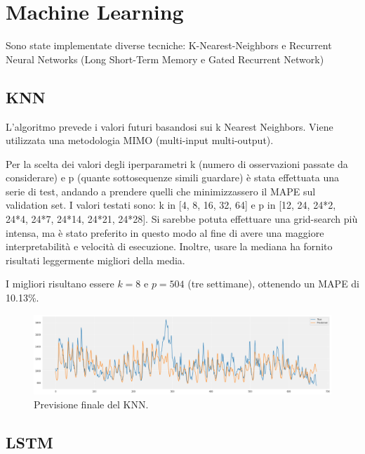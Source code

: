 
\section{Machine Learning}

Sono state implementate diverse tecniche: K-Nearest-Neighbors e Recurrent Neural Networks (Long Short-Term Memory e Gated Recurrent Network)





\subsection{KNN}

L'algoritmo prevede i valori futuri basandosi sui k Nearest Neighbors. Viene utilizzata una metodologia MIMO (multi-input multi-output). 

Per la scelta dei valori degli iperparametri k (numero di osservazioni passate da considerare) e p (quante sottosequenze simili guardare) è stata effettuata una serie di test, andando a prendere quelli che minimizzassero il MAPE sul validation set. I valori testati sono: k in [4, 8, 16, 32, 64] e p in [12, 24, 24*2, 24*4, 24*7, 24*14, 24*21, 24*28]. Si sarebbe potuta effettuare una grid-search più intensa, ma è stato preferito in questo modo al fine di avere una maggiore interpretabilità e velocità di esecuzione. Inoltre, usare la mediana ha fornito risultati leggermente migliori della media. 

I migliori risultano essere $k=8$ e $p = 504$ (tre settimane), ottenendo un MAPE di 10.13\%.

\begin{figure}[H]
\centering
\includegraphics[width=14cm]{Pictures/prediction_knn.png}
\caption{Previsione finale del KNN.}
\end{figure}





\subsection{LSTM}

